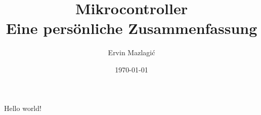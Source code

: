 \documentclass[10pt,a4paper]{article}
\author{Ervin Mazlagi\'c}
\date{\today}
\title{Mikrocontroller \\ \footnotesize{Eine persönliche Zusammenfassung}}
\begin{document}
	
	Hello world!
\end{document}
